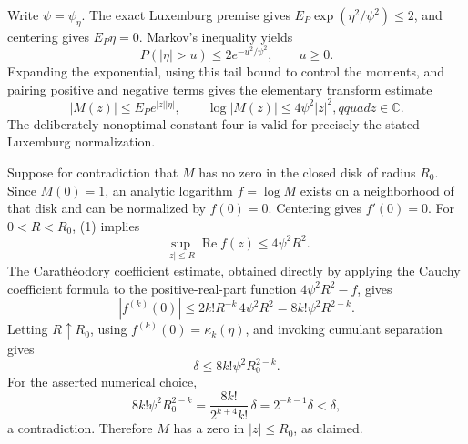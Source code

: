 Write \(\psi=\psi_{\eta}\).  The exact Luxemburg premise gives
\(E_P\exp(\eta^2/\psi^2)\le2\), and centering gives \(E_P\eta=0\).  Markov's inequality yields
\[
 P(|\eta|>u)\le2e^{-u^2/\psi^2},\qquad u\ge0.
\]
Expanding the exponential, using this tail bound to control the moments, and pairing positive and negative terms gives the elementary transform estimate
\[
 |M(z)|\le E_Pe^{|z||\eta|},
 \qquad
 \log |M(z)|\le4\psi^2|z|^2,qquad z\in\mathbb C. \tag{1}
\]
The deliberately nonoptimal constant four is valid for precisely the stated Luxemburg normalization.

Suppose for contradiction that \(M\) has no zero in the closed disk of radius \(R_0\).  Since \(M(0)=1\), an analytic logarithm \(f=\log M\) exists on a neighborhood of that disk and can be normalized by \(f(0)=0\).  Centering gives \(f'(0)=0\).  For \(0<R<R_0\), (1) implies
\[
 \sup_{|z|\le R}\operatorname{Re}f(z)\le4\psi^2R^2.
\]
The Carath\'eodory coefficient estimate, obtained directly by applying the Cauchy coefficient formula to the positive-real-part function \(4\psi^2R^2-f\), gives
\[
 |f^{(k)}(0)|
 \le 2k!R^{-k}\,4\psi^2R^2
 =8k!\psi^2R^{2-k}. \tag{2}
\]
Letting \(R\uparrow R_0\), using \(f^{(k)}(0)=\kappa_k(\eta)\), and invoking cumulant separation gives
\[
 \delta\le8k!\psi^2R_0^{2-k}.
\]
For the asserted numerical choice,
\[
 8k!\psi^2R_0^{2-k}
 =\frac{8k!}{2^{k+4}k!}\,\delta
 =2^{-k-1}\delta<\delta,
\]
a contradiction.  Therefore \(M\) has a zero in \(|z|\le R_0\), as claimed.